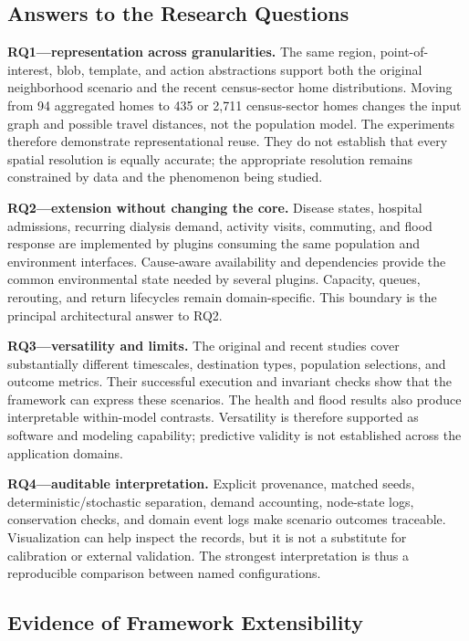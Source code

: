 \documentclass[pdflatex,sn-mathphys-num]{sn-jnl}%
\theoremstyle{thmstyleone}%
\theoremstyle{thmstyletwo}%
\theoremstyle{thmstylethree}%
\begin{document}
\subsection{Answers to the Research Questions}
\label{discussion:questions}

\textbf{RQ1---representation across granularities.} The same region, point-of-interest, blob, template, and action abstractions support both the original neighborhood scenario and the recent census-sector home distributions. Moving from 94 aggregated homes to 435 or 2,711 census-sector homes changes the input graph and possible travel distances, not the population model. The experiments therefore demonstrate representational reuse. They do not establish that every spatial resolution is equally accurate; the appropriate resolution remains constrained by data and the phenomenon being studied.

\textbf{RQ2---extension without changing the core.} Disease states, hospital admissions, recurring dialysis demand, activity visits, commuting, and flood response are implemented by plugins consuming the same population and environment interfaces. Cause-aware availability and dependencies provide the common environmental state needed by several plugins. Capacity, queues, rerouting, and return lifecycles remain domain-specific. This boundary is the principal architectural answer to RQ2.

\textbf{RQ3---versatility and limits.} The original and recent studies cover substantially different timescales, destination types, population selections, and outcome metrics. Their successful execution and invariant checks show that the framework can express these scenarios. The health and flood results also produce interpretable within-model contrasts. Versatility is therefore supported as software and modeling capability; predictive validity is not established across the application domains.

\textbf{RQ4---auditable interpretation.} Explicit provenance, matched seeds, deterministic/stochastic separation, demand accounting, node-state logs, conservation checks, and domain event logs make scenario outcomes traceable. Visualization can help inspect the records, but it is not a substitute for calibration or external validation. The strongest interpretation is thus a reproducible comparison between named configurations.

\subsection{Evidence of Framework Extensibility}
\end{document}
